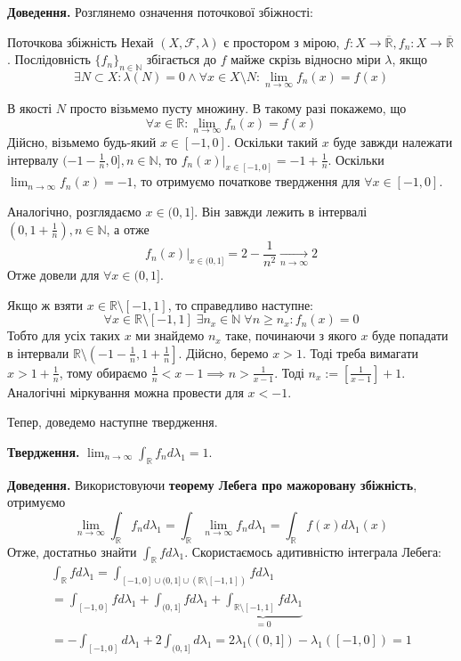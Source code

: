 \documentclass[14pt]{extarticle}
\begin{document}
\textbf{Доведення.} Розглянемо означення поточкової збіжності:
\begin{def*}{Поточкова збіжність}
    Нехай $(X,\mathcal{F},\lambda)$ є простором з мірою, $f: X \to \overline{\mathbb{R}},f_n: X \to \overline{\mathbb{R}}$. Послідовність $\{f_n\}_{n \in \mathbb{N}}$ збігається до $f$ майже скрізь відносно міри $\lambda$, якщо
    \[
    \exists N \subset X: \lambda(N) = 0 \wedge \forall x \in X \setminus N: \lim_{n \to \infty}f_n(x) = f(x)
    \]
\end{def*}

В якості $N$ просто візьмемо пусту множину. В такому разі покажемо, що
\[
\forall x \in \mathbb{R}: \lim_{n \to \infty} f_n(x) = f(x)
\]
Дійсно, візьмемо будь-який $x \in [-1,0]$. Оскільки такий $x$ буде завжди належати інтервалу $(-1-\frac{1}{n},0],n\in\mathbb{N}$, то $f_n(x)\Big|_{x \in [-1,0]} = -1+\frac{1}{n}$. Оскільки $\lim_{n \to \infty}f_n(x) = -1$, то отримуємо початкове твердження для $\forall x \in [-1,0]$.

Аналогічно, розглядаємо $x \in (0,1]$. Він завжди лежить в інтервалі $(0,1+\frac{1}{n}), n \in \mathbb{N}$, а отже
\[
f_n(x) \Big|_{x \in (0,1]} = 2 - \frac{1}{n^2} \xrightarrow[n \to \infty]{} 2
\]
Отже довели для $\forall x \in (0,1]$.

Якщо ж взяти $x \in \mathbb{R} \setminus [-1,1]$, то справедливо наступне:
\[
\forall x \in \mathbb{R} \setminus [-1,1] \; \exists n_x \in \mathbb{N} \; \forall n \geq n_x: f_n(x) = 0
\]
Тобто для усіх таких $x$ ми знайдемо $n_x$ таке, починаючи з якого $x$ буде попадати в інтервали $\mathbb{R} \setminus \left(-1-\frac{1}{n},1+\frac{1}{n}\right]$. Дійсно, беремо $x>1$. Тоді треба вимагати $x > 1+\frac{1}{n}$, тому обираємо $\frac{1}{n} < x-1 \implies n > \frac{1}{x-1}$. Тоді $n_x := \left[\frac{1}{x-1}\right]+1$. Аналогічні міркування можна провести для $x<-1$. 

Тепер, доведемо наступне твердження.

\textbf{Твердження.} $\lim_{n \to \infty}\int_{\mathbb{R}}f_nd\lambda_1 = 1$.

\textbf{Доведення.} Використовуючи \textbf{теорему Лебега про мажоровану збіжність}, отримуємо
\[
\lim_{n \to \infty}\int_{\mathbb{R}} f_nd\lambda_1 = \int_{\mathbb{R}}\lim_{n \to \infty} f_nd\lambda_1 = \int_{\mathbb{R}} f(x)d\lambda_1(x)
\]
Отже, достатньо знайти $\int_{\mathbb{R}}fd\lambda_1$. Скористаємось адитивністю інтеграла Лебега:
\begin{gather*}
\int_{\mathbb{R}}fd\lambda_1 = \int_{[-1,0] \cup (0,1] \cup (\mathbb{R} \setminus [-1,1])}fd\lambda_1 \\
= \int_{[-1,0]}fd\lambda_1 + \int_{(0,1]}fd\lambda_1 + \underbrace{\int_{\mathbb{R} \setminus [-1,1]}fd\lambda_1}_{=0}\\ 
=-\int_{[-1,0]}d\lambda_1 + 2\int_{(0,1]} d\lambda_1 = 2\lambda_1((0,1]) - \lambda_1([-1,0]) = 1
\end{gather*}
\end{document}
